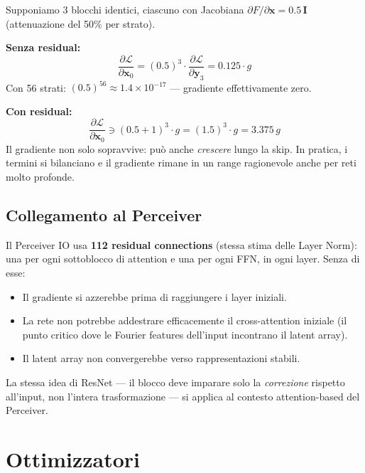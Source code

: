 \documentclass[
  11pt,
]{article}
\begin{document}
\begin{notabox}[title={\textbf{Esempio: 3 strati, gradiente senza e con residual}}]
Supponiamo 3 blocchi identici, ciascuno con Jacobiana $\partial F / \partial \mathbf{x} = 0.5\,\mathbf{I}$ (attenuazione del 50\% per strato).

\textbf{Senza residual:}
\[
\frac{\partial \mathcal{L}}{\partial \mathbf{x}_0} = (0.5)^3 \cdot \frac{\partial \mathcal{L}}{\partial \mathbf{y}_3} = 0.125 \cdot g
\]
Con 56 strati: $(0.5)^{56} \approx 1.4 \times 10^{-17}$ --- gradiente effettivamente zero.

\textbf{Con residual:}
\[
\frac{\partial \mathcal{L}}{\partial \mathbf{x}_0} \ni (0.5 + 1)^3 \cdot g = (1.5)^3 \cdot g = 3.375\,g
\]
Il gradiente non solo sopravvive: può anche \emph{crescere} lungo la skip. In pratica, i termini si bilanciano e il gradiente rimane in un range ragionevole anche per reti molto profonde.
\end{notabox}

\subsection{Collegamento al Perceiver}

\begin{notabox}[title={\textbf{Residual connections nel Perceiver IO}}]
Il Perceiver IO usa \textbf{112 residual connections} (stessa stima delle Layer Norm): una per ogni sottoblocco di attention e una per ogni FFN, in ogni layer. Senza di esse:
\begin{itemize}
  \item Il gradiente si azzerebbe prima di raggiungere i layer iniziali.
  \item La rete non potrebbe addestrare efficacemente il cross-attention iniziale (il punto critico dove le Fourier features dell'input incontrano il latent array).
  \item Il latent array non convergerebbe verso rappresentazioni stabili.
\end{itemize}
La stessa idea di ResNet --- il blocco deve imparare solo la \emph{correzione} rispetto all'input, non l'intera trasformazione --- si applica al contesto attention-based del Perceiver.
\end{notabox}

\section{Ottimizzatori}
\label{app:optimizers}
\end{document}
